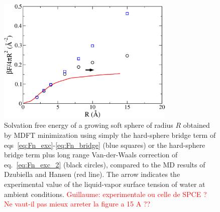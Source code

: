 \documentclass[aip,jcp,preprint]{revtex4-1}
\begin{document}
\begin{figure}
    \includegraphics[width=8.5cm]{ener_systemChandler_VdW_MD_SPC.pdf}
    \caption{
        \label{fig:free_energy_Hansen}
        Solvation free energy of a  growing soft sphere of radius $R$ obtained by MDFT minimization using simply the hard-sphere bridge term of eqs~\ref{eq:Fn_exc}-\ref{eq:Fn_bridge} (blue squares) or the hard-sphere bridge term plus long range Van-der-Waals correction of eq.~\ref{eq:Fn_exc_2} (black circles), compared to the MD results of Dzubiella and Hansen\cite{dzubiella04} (red line). The arrow
        indicates the experimental value of the liquid-vapor surface tension of water at ambient conditions. \textcolor{red}{Guillaume: experimentale ou celle de SPCE ? Ne vaut-il pas mieux arreter la figure a 15 A ??}
        }
\end{figure}
\end{document}
